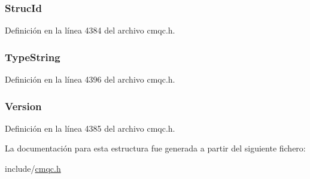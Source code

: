 \hypertarget{structtag_m_q_i_m_p_o_a0530922ca944569b52601d74941f96e4}{}
\subsubsection[{Struc\+Id}]{ Struc\+Id}\label{structtag_m_q_i_m_p_o_a0530922ca944569b52601d74941f96e4}


Definición en la línea 4384 del archivo cmqc.\+h.

\hypertarget{structtag_m_q_i_m_p_o_a191c43a197f69fa0bdd2d9335960f6b0}{}
\subsubsection[{Type\+String}]{ Type\+String}\label{structtag_m_q_i_m_p_o_a191c43a197f69fa0bdd2d9335960f6b0}


Definición en la línea 4396 del archivo cmqc.\+h.

\hypertarget{structtag_m_q_i_m_p_o_a0656ef8f766b3907d394d88a35d7b7e9}{}
\subsubsection[{Version}]{ Version}\label{structtag_m_q_i_m_p_o_a0656ef8f766b3907d394d88a35d7b7e9}


Definición en la línea 4385 del archivo cmqc.\+h.



La documentación para esta estructura fue generada a partir del siguiente fichero\+:\begin{DoxyCompactItemize}
\item 
include/\hyperlink{cmqc_8h}{cmqc.\+h}\end{DoxyCompactItemize}
